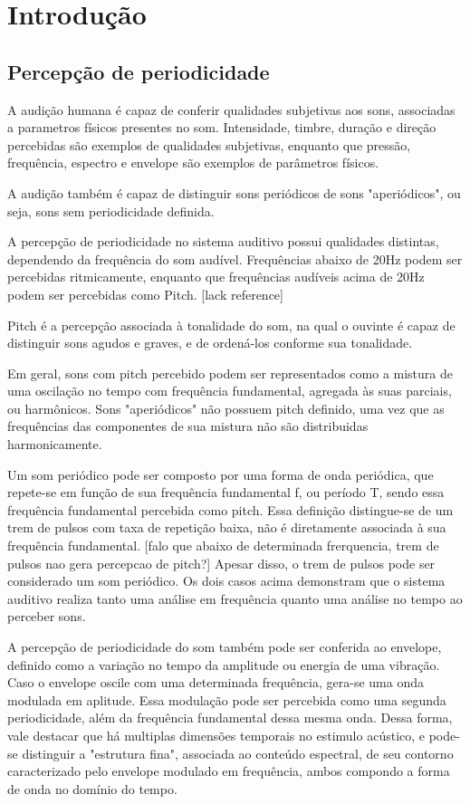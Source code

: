 \chapter{Introdu{\c c}\~ao}
\section{Percepção de periodicidade}
A audição humana é capaz de conferir qualidades subjetivas aos sons, associadas
a parametros físicos presentes no som. Intensidade, timbre, duração e direção percebidas
são exemplos de qualidades subjetivas, enquanto que pressão, frequência,
espectro e envelope são exemplos de parâmetros físicos.\cite{rossing2002}

A audição também é capaz de distinguir sons periódicos de sons "aperiódicos", ou seja,
 sons sem periodicidade definida.

A percepção de periodicidade no sistema auditivo possui qualidades distintas,
 dependendo da frequência do som audível. Frequências abaixo de
20Hz podem ser percebidas ritmicamente, enquanto que frequências audíveis acima de
 20Hz podem ser percebidas como Pitch. [lack reference]

Pitch é a percepção associada à tonalidade do som, na qual o ouvinte é capaz
de distinguir sons agudos e graves, e de ordená-los conforme sua tonalidade.
 \cite{angus2009}

Em geral, sons com pitch percebido podem ser representados como a mistura de uma
oscilação no tempo com frequência fundamental, agregada às suas parciais, ou
 harmônicos.  Sons "aperiódicos" não possuem pitch definido, uma vez que as frequências das
 componentes de sua mistura não são distribuidas harmonicamente. \cite{langner1992}

 Um som periódico pode ser composto por uma forma de onda periódica, que
 repete-se em função de sua frequência fundamental f, ou período T, sendo essa 
 frequência fundamental percebida como pitch. Essa definição distingue-se de um
 trem de pulsos com taxa de repetição baixa, não é diretamente associada à sua frequência fundamental.
 [falo que abaixo de determinada frerquencia, trem de pulsos nao gera percepcao de pitch?]
 Apesar disso, o trem de pulsos pode ser considerado um som
 periódico. Os dois casos acima demonstram que o sistema auditivo realiza tanto uma análise
 em frequência quanto uma análise no tempo ao perceber sons. \citet{Rossing}

A percepção de periodicidade do som também pode ser conferida ao envelope,
definido como a variação no tempo da amplitude ou energia de uma vibração.
Caso o envelope oscile com uma determinada frequência, gera-se uma onda
modulada em aplitude.
Essa modulação pode ser percebida como uma segunda periodicidade,
além da frequência fundamental dessa mesma onda. Dessa forma, vale destacar
que há multiplas dimensões temporais no estimulo acústico, e pode-se distinguir
a "estrutura fina", associada ao conteúdo espectral, de seu contorno caracterizado
pelo envelope modulado em frequência, ambos compondo a forma de onda no
domínio do tempo. \cite{joris2004}

